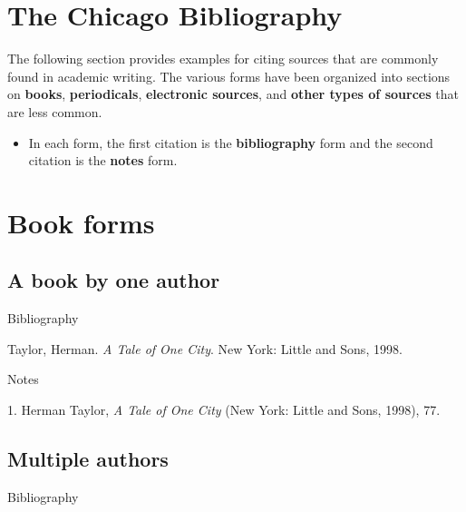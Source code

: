 \newpage

\section{The Chicago Bibliography}

The following section provides examples for citing sources that are commonly
found in academic writing. The various forms have been organized into sections 
on \textbf{books}, \textbf{periodicals}, \textbf{electronic sources}, and
\textbf{other types of sources} that are less common.

\begin{itemize}
\item In each form, the first citation is the \textbf{bibliography} form and the
second citation is the \textbf{notes} form.
\end{itemize}

\section{Book forms}

\subsection{A book by one author}


\begin{center}{Bibliography}\end{center}

\begin{singlespace}
\noindent{} {Taylor, Herman. \emph{A Tale of One City}. New York:
Little and Sons, 1998.}
\end{singlespace}




\begin{center}{Notes}\end{center} 
\begin{singlespace}
\noindent\hspace{1.2cm}1. Herman Taylor,
\emph{A Tale of One City} (New York: Little and Sons, 1998), 77.
\end{singlespace}


\subsection{Multiple authors}


\begin{center}{Bibliography}\end{center}

